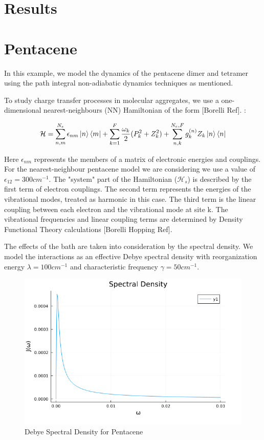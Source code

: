 
\section{Results}
\section{Pentacene}

In this example, we model the dynamics of the pentacene dimer and tetramer using the path integral non-adiabatic dynamics techniques as mentioned.

To study charge transfer processes in molecular aggregates, we use a one-dimensional nearest-neighbours (NN) Hamiltonian of the form [Borelli Ref]. :

\begin{equation} \label{6.x}    
    \mathcal{H} = \sum_{n, m}^{N_e} \epsilon_{nm} \ket{n} \bra{m} + \sum_{k = 1}^{F} \frac{\omega_k}{2} (P_k^{2} + Z_k^{2}) + \sum_{n, k}^{N_e, F} g_k^{(n)} Z_k \ket{n}\bra{n}
\end{equation}

Here $\epsilon_{nm}$ represents the members of a matrix of electronic energies and couplings. For the nearest-neighbour pentacene model we are considering we use a value of $\epsilon_{12} = 300 cm^{-1}$. The "system" part of the Hamiltonian ($\mathcal{H}_s$) is described by the first term of electron couplings. The second term represents the energies of the vibrational modes, treated as harmonic in this case. The third term is the linear coupling between each electron and the vibrational mode at site k. The vibrational frequencies and linear coupling terms are determined by Density Functional Theory calculations [Borelli Hopping Ref]. 

The effects of the bath are taken into consideration by the spectral density. We model the interactions as an effective Debye spectral density with reorganization energy $\lambda = 100 cm^{-1}$ and characteristic frequency $\gamma = 50 cm^{-1}$.

\begin{figure}
    \centering
    \includegraphics[scale=0.3]{Figures/jw_pentacene.png}
    \caption{Debye Spectral Density for Pentacene}
\end{figure}

